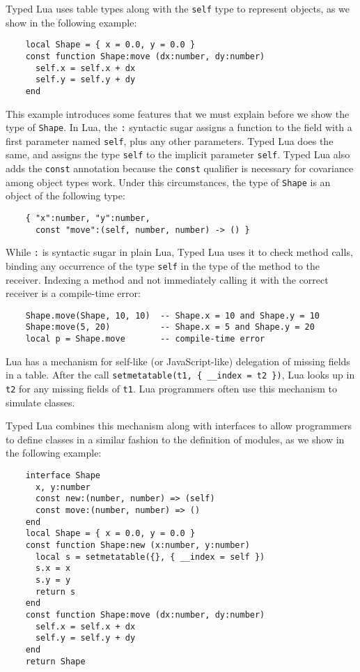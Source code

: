 Typed Lua uses table types along with the \texttt{self} type to
represent objects, as we show in the following example:
\begin{verbatim}
    local Shape = { x = 0.0, y = 0.0 }
    const function Shape:move (dx:number, dy:number)
      self.x = self.x + dx
      self.y = self.y + dy
    end
\end{verbatim}

This example introduces some features that we must explain
before we show the type of \texttt{Shape}.
In Lua, the \texttt{:} syntactic sugar assigns a function to the
field with a first parameter named \texttt{self}, plus any other
parameters.
Typed Lua does the same, and assigns the type \texttt{self} to the
implicit parameter \texttt{self}.
Typed Lua also adds the \texttt{const} annotation because the
\texttt{const} qualifier is necessary for covariance among object types work.
Under this circumstances, the type of \texttt{Shape} is an object of
the following type:
\begin{verbatim}
    { "x":number, "y":number,
      const "move":(self, number, number) -> () }
\end{verbatim}

While \texttt{:} is syntactic sugar in plain Lua, Typed Lua uses it
to check method calls, binding any occurrence of the type \texttt{self}
in the type of the method to the receiver.
Indexing a method and not immediately calling it with the correct
receiver is a compile-time error:
\begin{verbatim}
    Shape.move(Shape, 10, 10)  -- Shape.x = 10 and Shape.y = 10
    Shape:move(5, 20)          -- Shape.x = 5 and Shape.y = 20
    local p = Shape.move       -- compile-time error
\end{verbatim}

Lua has a mechanism for self-like (or JavaScript-like) delegation of
missing fields in a table.
After the call \texttt{setmetatable(t1, \{ \string_\string_index = t2 \})},
Lua looks up in \texttt{t2} for any missing fields of \texttt{t1}.
Lua programmers often use this mechanism to simulate classes.

Typed Lua combines this mechanism along with interfaces to allow
programmers to define classes in a similar fashion to the definition
of modules, as we show in the following example:
\begin{verbatim}
    interface Shape
      x, y:number
      const new:(number, number) => (self)
      const move:(number, number) => ()
    end
    local Shape = { x = 0.0, y = 0.0 }
    const function Shape:new (x:number, y:number)
      local s = setmetatable({}, { __index = self })
      s.x = x
      s.y = y
      return s
    end
    const function Shape:move (dx:number, dy:number)
      self.x = self.x + dx
      self.y = self.y + dy
    end
    return Shape
\end{verbatim}

